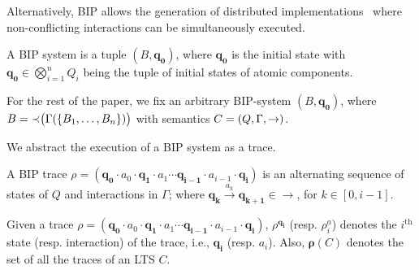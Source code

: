 Alternatively, BIP allows the generation of distributed
implementations~\cite{bip-distributed} where non-conflicting interactions
can be simultaneously executed.

\begin{definition}
\label{def:bipsystem}
A BIP system is a tuple $(B,  \bm{q_0})$, where $ \bm{q_0}$ is the initial state with $ \bm{q_0} \in \bigotimes_{i=1}^n Q_i$ being the tuple of initial states of atomic components.
\end{definition}


For the rest of the paper, we fix an arbitrary BIP-system $(B,  \bm{q_0})$, where  $B = \mathit{\prec}\big(\Gamma(\{B_1, \ldots, B_n\})\big)$ with semantics $C = (Q, \Gamma, \stackrel{}{\rightarrow})$.

We abstract the execution of a BIP system as a trace.
%
\begin{definition}
\label{def:trace-global}
A BIP trace $\rho = ( \bm{q_0} \cdot a_0 \cdot  \bm{q_1} \cdot a_1 \cdots  \bm{q_{i-1}} \cdot a_{i-1} \cdot  \bm{q_i})$ is an alternating sequence of states of $Q$ and interactions in $\Gamma$; where $\bm{q_k} \xrightarrow{a_k}  \bm{q_{k+1}} \in \rightarrow$, for $k \in [0, i-1]$.
\end{definition}

Given a trace $\rho = ( \bm{q_0} \cdot a_0 \cdot  \bm{q_1} \cdot a_1 \cdots  \bm{q_{i-1}} \cdot a_{i-1} \cdot  \bm{q_i})$, 
$\rho^{ \bm{q_i}}$ (resp. $\rho^a_i$) denotes the $i^\text{th}$ state (resp. interaction) of the trace, i.e., $ \bm{q_i}$ (resp. $a_i$). Also, $\bm{\rho}(C)$ denotes the set of all the traces of an LTS $C$. 
